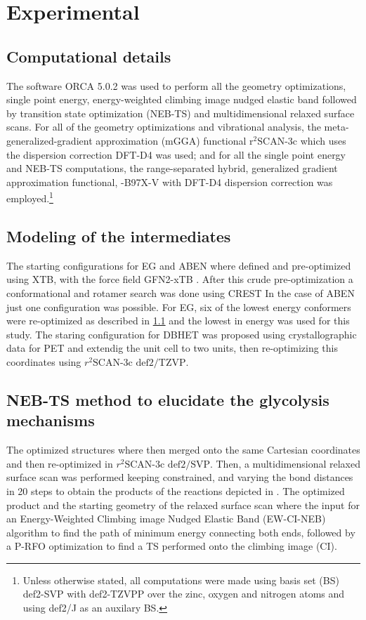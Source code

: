 \section{Experimental}
\label{sec:Experimental}

\subsection{Computational details}
\label{subsec:ex:CompDetails}
The software ORCA 5.0.2 \cite{Neese2022} was used to perform all the geometry optimizations, single point energy, energy-weighted climbing image nudged elastic band followed by transition state optimization (NEB-TS) and multidimensional relaxed surface scans.
For all of the geometry optimizations and vibrational analysis, the meta-generalized-gradient approximation (mGGA) functional $\textrm{r}^2\textrm{SCAN-3c}$ which uses the dispersion correction DFT-D4 \cite{Caldeweyher2020} was used; and for all the single point energy and NEB-TS computations, the range-separated hybrid, generalized gradient approximation functional, \chemomega-B97X-V with DFT-D4 dispersion correction was employed.\footnote{Unless otherwise stated, all computations were made using basis set (BS) def2-SVP with def2-TZVPP over the zinc, oxygen and nitrogen atoms and using def2/J as an auxilary BS.}

\subsection{Modeling of the intermediates}
\label{subsec:ex:ModIntermed}
The starting configurations for EG and ABEN where defined and pre-optimized using XTB, \cite{Bannwarth2021} with the force field GFN2-xTB \cite{Bannwarth2019}. After this crude pre-optimization a conformational and rotamer search was done using CREST \cite{Pracht2020}
In the case of ABEN just one configuration was possible. For EG, six of the lowest energy conformers were re-optimized as described in \ref{subsec:ex:CompDetails} and the lowest in energy was used for this study. The staring configuration for DBHET was proposed using crystallographic data for PET \cite{Daubeny1954} and extendig the unit cell to two units, then re-optimizing this coordinates using $r^2\textrm{SCAN-3c}\textrm{ def2/TZVP}$.

\subsection{NEB-TS method to elucidate the glycolysis mechanisms}
\label{subsec:ex:NEB-TS}
The optimized structures where then merged onto the same Cartesian coordinates and then re-optimized in $r^2\textrm{SCAN-3c}\textrm{ def2/SVP}$. Then, a multidimensional relaxed surface scan was performed keeping constrained, and varying the bond distances in 20 steps to obtain the products of the reactions depicted in . The optimized product and the starting geometry of the relaxed surface scan where the input for an Energy-Weighted Climbing image Nudged Elastic Band (EW-CI-NEB) \cite{Asgeirsson2021} algorithm to find the path of minimum energy connecting both ends, followed by a P-RFO optimization to find a TS performed onto the climbing image (CI).

